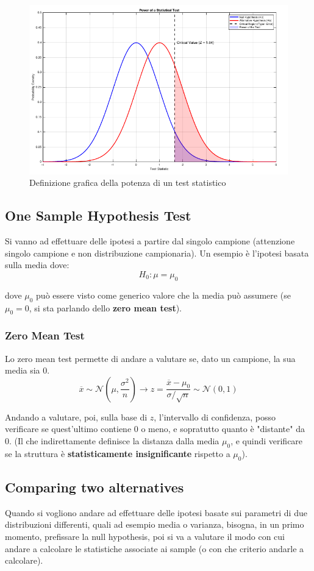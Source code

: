 \begin{figure}[h]
\centering
\includegraphics[width=.7\textwidth]{img/chapter-4/power-value.png}
\caption{Definizione grafica della potenza di un test statistico}\label{img:power-value}
\end{figure}

\subsection{One Sample Hypothesis Test}
Si vanno ad effettuare delle ipotesi a partire dal singolo campione (attenzione singolo campione e non distribuzione campionaria). Un esempio è l'ipotesi basata sulla media dove:
\[
H_0: \mu = \mu_0
\]

dove \(\mu_0\) può essere visto come generico valore che la media può assumere (se \(\mu_0 = 0\), si sta parlando dello \textbf{zero mean test}).

\subsubsection{Zero Mean Test}
Lo zero mean test permette di andare a valutare se, dato un campione, la sua media sia 0. 
\[
\overline{x} \sim \mathcal{N}(\mu, \frac{\sigma^2}{n}) \to z = \frac{\overline{x} - \mu_0}{\sigma/\sqrt{n}} \sim \mathcal{N}(0,1)
\]

Andando a valutare, poi, sulla base di \(z\), l'intervallo di confidenza, posso verificare se quest'ultimo contiene 0 o meno, e sopratutto quanto è "distante" da 0. (Il che indirettamente definisce la distanza dalla media \(\mu_0\), e quindi verificare se la struttura è \textbf{statisticamente insignificante} rispetto a \(\mu_0\)).

\subsection{Comparing two alternatives}
Quando si vogliono andare ad effettuare delle ipotesi basate sui parametri di due distribuzioni differenti, quali ad esempio media o varianza, bisogna, in un primo momento, prefissare la null hypothesis, poi si va a valutare il modo con cui andare a calcolare le statistiche associate ai sample (o con che criterio andarle a calcolare).

